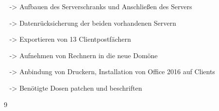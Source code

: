 {{	\textbullet~ -> Aufbauen des Serverschranks und Anschließen des Servers\par
	\textbullet~ -> Datenrücksicherung der beiden vorhandenen Servern\par
	\textbullet~ -> Exportieren von 13 Clientpostfächern\par
	\textbullet~ -> Aufnehmen von Rechnern in die neue Domöne\par
	\textbullet~ -> Anbindung von Druckern, Installation von Office 2016 auf Clients\par
	\textbullet~ -> Benötigte Dosen patchen und beschriften
	}{}{9}
}{}
\Unterschrift
\newpage
